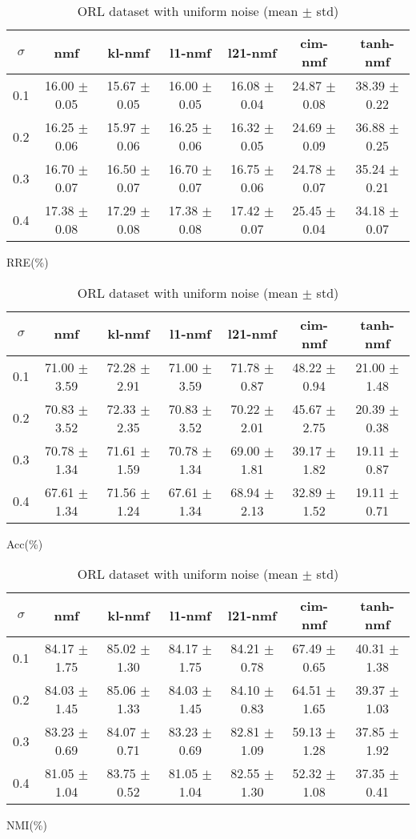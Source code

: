 \documentclass{article} %
\begin{document}
\begin{table}
\begin{subtable}{\linewidth}
\begin{tabular}{c|cccccc}$\sigma$ & nmf & kl-nmf & l1-nmf & l21-nmf & cim-nmf & tanh-nmf \\\hline
0.1 & 16.00 $\pm$ 0.05 & 15.67 $\pm$ 0.05 & 16.00 $\pm$ 0.05 & 16.08 $\pm$ 0.04 & 24.87 $\pm$ 0.08 & 38.39 $\pm$ 0.22 \\
0.2 & 16.25 $\pm$ 0.06 & 15.97 $\pm$ 0.06 & 16.25 $\pm$ 0.06 & 16.32 $\pm$ 0.05 & 24.69 $\pm$ 0.09 & 36.88 $\pm$ 0.25 \\
0.3 & 16.70 $\pm$ 0.07 & 16.50 $\pm$ 0.07 & 16.70 $\pm$ 0.07 & 16.75 $\pm$ 0.06 & 24.78 $\pm$ 0.07 & 35.24 $\pm$ 0.21 \\
0.4 & 17.38 $\pm$ 0.08 & 17.29 $\pm$ 0.08 & 17.38 $\pm$ 0.08 & 17.42 $\pm$ 0.07 & 25.45 $\pm$ 0.04 & 34.18 $\pm$ 0.07 \\
\end{tabular}\caption{RRE(\%)}\end{subtable}
\begin{subtable}{\linewidth}
\begin{tabular}{c|cccccc}$\sigma$ & nmf & kl-nmf & l1-nmf & l21-nmf & cim-nmf & tanh-nmf \\\hline
0.1 & 71.00 $\pm$ 3.59 & 72.28 $\pm$ 2.91 & 71.00 $\pm$ 3.59 & 71.78 $\pm$ 0.87 & 48.22 $\pm$ 0.94 & 21.00 $\pm$ 1.48 \\
0.2 & 70.83 $\pm$ 3.52 & 72.33 $\pm$ 2.35 & 70.83 $\pm$ 3.52 & 70.22 $\pm$ 2.01 & 45.67 $\pm$ 2.75 & 20.39 $\pm$ 0.38 \\
0.3 & 70.78 $\pm$ 1.34 & 71.61 $\pm$ 1.59 & 70.78 $\pm$ 1.34 & 69.00 $\pm$ 1.81 & 39.17 $\pm$ 1.82 & 19.11 $\pm$ 0.87 \\
0.4 & 67.61 $\pm$ 1.34 & 71.56 $\pm$ 1.24 & 67.61 $\pm$ 1.34 & 68.94 $\pm$ 2.13 & 32.89 $\pm$ 1.52 & 19.11 $\pm$ 0.71 \\
\end{tabular}\caption{Acc(\%)}\end{subtable}
\begin{subtable}{\linewidth}
\begin{tabular}{c|cccccc}$\sigma$ & nmf & kl-nmf & l1-nmf & l21-nmf & cim-nmf & tanh-nmf \\\hline
0.1 & 84.17 $\pm$ 1.75 & 85.02 $\pm$ 1.30 & 84.17 $\pm$ 1.75 & 84.21 $\pm$ 0.78 & 67.49 $\pm$ 0.65 & 40.31 $\pm$ 1.38 \\
0.2 & 84.03 $\pm$ 1.45 & 85.06 $\pm$ 1.33 & 84.03 $\pm$ 1.45 & 84.10 $\pm$ 0.83 & 64.51 $\pm$ 1.65 & 39.37 $\pm$ 1.03 \\
0.3 & 83.23 $\pm$ 0.69 & 84.07 $\pm$ 0.71 & 83.23 $\pm$ 0.69 & 82.81 $\pm$ 1.09 & 59.13 $\pm$ 1.28 & 37.85 $\pm$ 1.92 \\
0.4 & 81.05 $\pm$ 1.04 & 83.75 $\pm$ 0.52 & 81.05 $\pm$ 1.04 & 82.55 $\pm$ 1.30 & 52.32 $\pm$ 1.08 & 37.35 $\pm$ 0.41 \\
\end{tabular}\caption{NMI(\%)}\end{subtable}
\caption{ORL dataset with uniform noise (mean $\pm$ std)}
\end{table}
\end{document}
